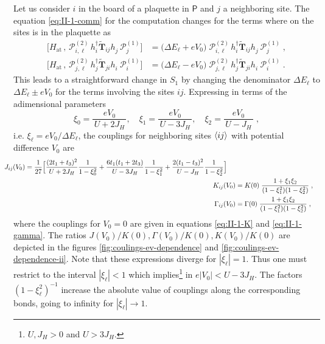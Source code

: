 Let us consider $i$ in the board of a plaquette in $\mathsf{P}$ and $j$ a neighboring site. The equation  \eqref{eq:II-1-comm} for the computation changes for the terms where on the sites is in the plaquette as
\begin{equation}
\begin{split}
        \big[ H_{\text{at}} \, ,\, \mathcal{P}^{(2)}_{i,\ell} \, h_i^\dagger  \tilde{\mathbf{T}}_{ij} h_j^{\phantom{\dagger}} \, \mathcal{P}^{(1)}_{j} \big] &= \big( \Delta E_{\ell} + eV_0 \big) \;  \mathcal{P}^{(2)}_{i,\ell} \, h_i^\dagger  \tilde{\mathbf{T}}_{ij} h_j^{\phantom{\dagger}} \, \mathcal{P}^{(1)}_{j}
        \; , \\
        \big[ H_{\text{at}} \, ,\, \mathcal{P}^{(2)}_{j,\ell} \, h_j^\dagger  \tilde{\mathbf{T}}_{ji} h_i^{\phantom{\dagger}} \, \mathcal{P}^{(1)}_{i} \big] &= \big( \Delta E_{\ell} - eV_0 \big) \;   \mathcal{P}^{(2)}_{j,\ell} \, h_j^\dagger  \tilde{\mathbf{T}}_{ji} h_i^{\phantom{\dagger}} \, \mathcal{P}^{(1)}_{i}
        \; .
\end{split}
\end{equation}
This leads to a straightforward change in $S_1$ by changing the denominator $\Delta E_\ell$ to $\Delta E_\ell \pm e V_0$ for the terms involving the sites $ij$.
Expressing in terms of the adimensional parameters
\begin{equation}
    \xi_{0} = \frac{eV_0}{\,U+2J_H\,}, \quad
    \xi_{1} = \frac{eV_0}{\,U-3J_H\,} , \quad
    \xi_{2} = \frac{eV_0}{\,U-J_H\,} \; ,
\end{equation}
i.e. $\xi_{\ell}=eV_0/\Delta E_{\ell}$,  the couplings for neighboring sites $\braket{ij}$ with potential difference $V_0$ are
\begin{align}
\begin{split}\hspace*{-5mm}
        J_{ij}(V_0) &= \frac{1}{27} \Big[
    \frac{(2  t_{1}+ t_{3})^2}{ U+2J_H}\frac{1}{1-\xi_0^2}
    +\frac{6t_{1} ( t_{1}+2  t_{3})}{U-3J_H} \frac{1}{1-\xi_1^2}
    + \frac{2(t_{1}-t_{3})^2}{U-J_H}\frac{1}{1-\xi_2^2} \Big]  \; \end{split} \label{eq:II-1-V-J}\\  \hspace*{-5mm}
   K_{ij}(V_0)
   &= K(0)
   \; \frac{1+\xi_1 \xi_2}{(1-\xi_1^2)(1-\xi_2^2)}
   \; , \label{eq:II-1-V-K}  \\ \hspace*{-5mm}
   \Gamma_{ij}(V_0)
   &= \Gamma(0) \; \frac{1+\xi_1 \xi_2}{(1-\xi_1^2)(1-\xi_2^2)} \; ,    \label{eq:II-1-V-G}
\end{align}
where the couplings for $V_0=0$ are given in equations \eqref{eq:II-1-K} and \eqref{eq:II-1-gamma}.
The ratios $J(V_0)/K(0), \Gamma(V_0)/K(0), K(V_0)/K(0)$ are depicted in the figures \ref{fig:coulings-ev-dependence} and \ref{fig:coulings-ev-dependence-ii}.
Note that these expressions diverge for $|\xi_\ell|=1$. Thus one must restrict to the interval $|\xi_\ell|<1$ which implies\footnote{$U,J_H >0$ and $U>3J_H$.} in $e|V_0|<U-3 J_H$.
The factors $(1-\xi_\ell^2)^{-1}$ increase the absolute value of couplings along the corresponding bonds, going to infinity for $|\xi_\ell|\to1$.


